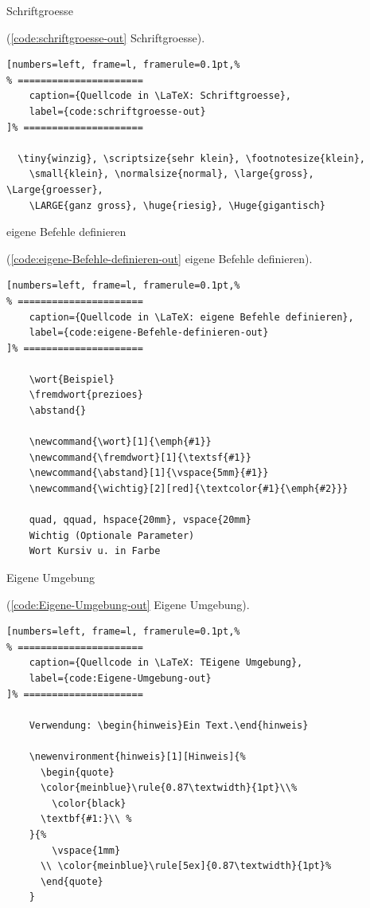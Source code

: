 Schriftgroesse

(\autoref{code:schriftgroesse-out} Schriftgroesse).
\lstset{language=[LaTeX]TeX} %
\begin{lstlisting}[numbers=left, frame=l, framerule=0.1pt,%
% ======================
	caption={Quellcode in \LaTeX: Schriftgroesse},
	label={code:schriftgroesse-out}
]% =====================

  \tiny{winzig}, \scriptsize{sehr klein}, \footnotesize{klein},
	\small{klein}, \normalsize{normal}, \large{gross}, \Large{groesser},
	\LARGE{ganz gross}, \huge{riesig}, \Huge{gigantisch}
\end{lstlisting}

 eigene Befehle definieren

(\autoref{code:eigene-Befehle-definieren-out} eigene Befehle definieren).
\lstset{language=[LaTeX]TeX} %
\begin{lstlisting}[numbers=left, frame=l, framerule=0.1pt,%
% ======================
	caption={Quellcode in \LaTeX: eigene Befehle definieren},
	label={code:eigene-Befehle-definieren-out}
]% =====================

	\wort{Beispiel}
	\fremdwort{prezioes}
	\abstand{}

	\newcommand{\wort}[1]{\emph{#1}}
	\newcommand{\fremdwort}[1]{\textsf{#1}}
	\newcommand{\abstand}[1]{\vspace{5mm}{#1}}
	\newcommand{\wichtig}[2][red]{\textcolor{#1}{\emph{#2}}}

	quad, qquad, hspace{20mm}, vspace{20mm}
	Wichtig (Optionale Parameter)
	Wort Kursiv u. in Farbe
\end{lstlisting}

Eigene Umgebung

(\autoref{code:Eigene-Umgebung-out} Eigene Umgebung).
\lstset{language=[LaTeX]TeX} %
\begin{lstlisting}[numbers=left, frame=l, framerule=0.1pt,%
% ======================
	caption={Quellcode in \LaTeX: TEigene Umgebung},
	label={code:Eigene-Umgebung-out}
]% =====================

	Verwendung: \begin{hinweis}Ein Text.\end{hinweis}

	\newenvironment{hinweis}[1][Hinweis]{%
	  \begin{quote}
	  \color{meinblue}\rule{0.87\textwidth}{1pt}\\%
		\color{black}
	  \textbf{#1:}\\ %
	}{%
		\vspace{1mm}
	  \\ \color{meinblue}\rule[5ex]{0.87\textwidth}{1pt}%
	  \end{quote}
	}
\end{lstlisting}

